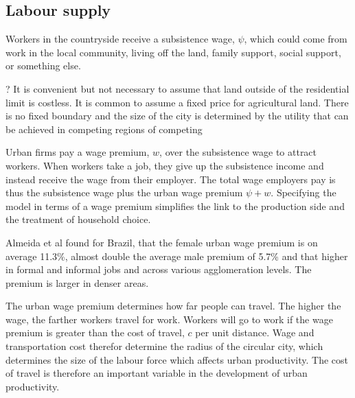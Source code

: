 \subsection{Labour supply}

Workers in the countryside receive a subsistence wage, $\psi$, which could come from work in the local community, living off the land, family support, social support, or something else. %


? It is convenient but not necessary to assume that land outside of the residential limit is costless. It is common to assume a fixed price for agricultural land. There is no fixed boundary and the size of the city is determined by the utility that can be achieved in competing regions of competing

Urban firms pay a wage premium, $w$, over the subsistence wage to attract workers. 
When workers take a job, they give up the subsistence income and instead receive the wage from their employer. 
The total wage employers pay is thus the subsistence wage plus the urban wage premium  $\psi + w$.
Specifying the model in terms of a wage premium simplifies the link to the production side and the treatment of household choice.

Almeida et al \cite{almeidaUrbanWagePremium2022} found for Brazil, that the female urban wage premium is on average 11.3\%, almost double the average male premium of 5.7\% and that higher in formal and informal jobs and across various agglomeration levels. The premium is larger in denser areas.

The \gls{urban wage premium} determines how far people can travel. The higher the wage, the farther workers travel for work. 
Workers will go to work if the wage premium is greater than the cost of travel, ${c}$ per unit distance. 
Wage and transportation cost therefor determine the radius of the circular city, which determines the size of the labour force which affects urban productivity.  The cost of travel is therefore an important variable in the development of urban productivity. 

